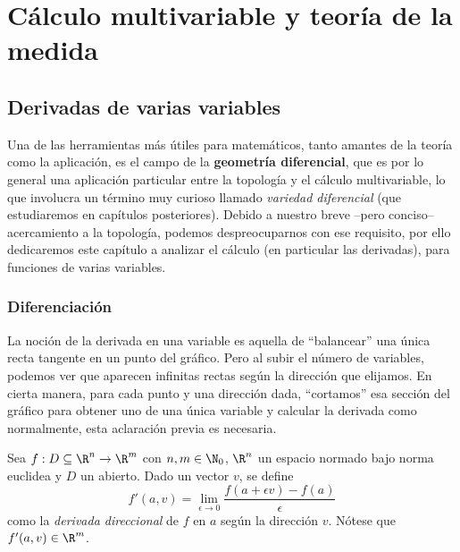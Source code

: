 \documentclass[11pt,oneside,a4paper]{book}
\begin{document}
\part{Cálculo multivariable y teoría de la medida}
\chapter{Derivadas de varias variables}
Una de las herramientas más útiles para matemáticos, tanto amantes de la teoría como la aplicación, es el campo de la \textbf{geometría diferencial}, que es por lo general una aplicación particular entre la topología y el cálculo multivariable, lo que involucra un término muy curioso llamado \textit{variedad diferencial} (que estudiaremos en capítulos posteriores). Debido a nuestro breve --pero conciso-- acercamiento a la topología, podemos despreocuparnos con ese requisito, por ello dedicaremos este capítulo a analizar el cálculo (en particular las derivadas), para funciones de varias variables.

\section{Diferenciación}
La noción de la derivada en una variable es aquella de ``balancear'' una única recta tangente en un punto del gráfico. Pero al subir el número de variables, podemos ver que aparecen infinitas rectas según la dirección que elijamos. En cierta manera, para cada punto y una dirección dada, ``cortamos'' esa sección del gráfico para obtener uno de una única variable y calcular la derivada como normalmente, esta aclaración previa es necesaria.
\begin{mydef}
Sea $f:D\subseteq\R^n\rightarrow\R^m$ con $n,m\in\N_0$, $\R^n$ un espacio normado bajo norma euclidea y $D$ un abierto. Dado un vector $v$, se define
$$f'(a,v)=\lim_{\epsilon\to 0}\frac{f(a+\epsilon v)-f(a)}{\epsilon}$$
como la \textit{derivada direccional} de $f$ en $a$ según la dirección $v$. Nótese que $f'(a,v)\in\R^m$.
\end{mydef}
\begin{figure}
\centering
{}
\caption{}
\end{figure}
\end{document}
